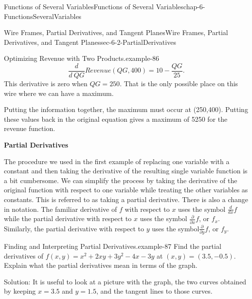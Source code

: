 \documentclass[oneside,10pt,]{book}
\newcommand{\terminology}[1]{\textbf{#1}}
\numberwithin{equation}{section}
\begin{document}
\begin{chapterptx}{Functions of Several Variables}{}{Functions of Several Variables}{}{}{chap-6-FunctionsSeveralVariables}
\begin{sectionptx}{Wire Frames, Partial Derivatives, and Tangent Planes}{}{Wire Frames, Partial Derivatives, and Tangent Planes}{}{}{sec-6-2-PartialDerivatives}
\begin{example}{Optimizing Revenue with Two Products.}{example-86}
%
\begin{equation*}
\frac{d}{d\ QG} Revenue(QG,400)=10-\frac{QG}{25}.
\end{equation*}
\hypertarget{p-2215}{}%
This derivative is zero when \(QG=250\).  That is the only possible place on this wire where we can have a maximum.%
\par
\hypertarget{p-2216}{}%
Putting the information together, the maximum must occur at (250,400).  Putting these values back in the original equation gives a maximum of \textdollar{}5250 for the revenue function.%
\end{example}
\hypertarget{p-2217}{}%
\terminology{Partial Derivatives}%
\par
\hypertarget{p-2218}{}%
The procedure we used in the first example of replacing one variable with a constant and then taking the derivative of the resulting single variable function is a bit cumbersome.  We can simplify the process by taking the derivative of the original function with respect to one variable while treating the other variables as constants.  This is referred to as taking a partial derivative.  There is also a change in notation.  The familiar derivative of \(f\) with respect to \(x\) uses the symbol \(\frac{d}{dx} f\)  while the partial derivative with respect to \(x\) uses the symbol \(\frac{\partial }{\partial x} f\), or \(f_x\).  Similarly, the partial derivative with respect to \(y\) uses the symbol\(\frac{\partial }{\partial y} f\), or \(f_y\).%
\begin{example}{Finding and Interpreting Partial Derivatives.}{example-87}%
\hypertarget{p-2219}{}%
Find the partial derivatives of \(f(x,y)=x^2+ 2xy+3y^2-4x-3y\) at  \((x,y)=(3.5,-0.5)\).  Explain what the partial derivatives mean in terms of the graph.%
\par
\hypertarget{p-2220}{}%
Solution:  It is useful to look at a picture with the graph, the two curves obtained by keeping \(x=3.5\) and \(y=1.5\), and the tangent lines to those curves.%
\begin{sidebyside}{1}{0.2}{0.2}{0}%
\begin{sbspanel}{0.6}%

\end{sbspanel}
\end{sidebyside}
\end{example}
\end{sectionptx}
\end{chapterptx}
\end{document}
